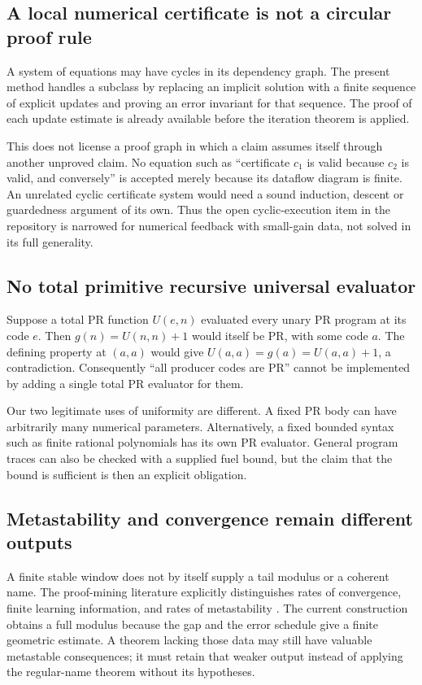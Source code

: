 \subsection{A local numerical certificate is not a circular proof rule}

A system of equations may have cycles in its dependency graph. The
present method handles a subclass by replacing an implicit solution
with a finite sequence of explicit updates and proving an error
invariant for that sequence. The proof of each update estimate is
already available before the iteration theorem is applied.

This does not license a proof graph in which a claim assumes itself
through another unproved claim. No equation such as ``certificate
\(c_1\) is valid because \(c_2\) is valid, and conversely'' is
accepted merely because its dataflow diagram is finite. An unrelated
cyclic certificate system would need a sound induction, descent or
guardedness argument of its own. Thus the open cyclic-execution item
in the repository is narrowed for numerical feedback with small-gain
data, not solved in its full generality.

\subsection{No total primitive recursive universal evaluator}

Suppose a total PR function \(U(e,n)\) evaluated every unary PR
program at its code \(e\). Then \(g(n)=U(n,n)+1\) would itself be
PR, with some code \(a\). The defining property at \((a,a)\)
would give
\(U(a,a)=g(a)=U(a,a)+1\), a contradiction. Consequently
``all producer codes are PR'' cannot be implemented by adding a
single total PR evaluator for them.

Our two legitimate uses of uniformity are different. A fixed PR
body can have arbitrarily many numerical parameters. Alternatively,
a fixed bounded syntax such as finite rational polynomials has its
own PR evaluator. General program traces can also be checked with a
supplied fuel bound, but the claim that the bound is sufficient is
then an explicit obligation.

\subsection{Metastability and convergence remain different outputs}

A finite stable window does not by itself supply a tail modulus or
a coherent name. The proof-mining literature explicitly distinguishes
rates of convergence, finite learning information, and rates of
metastability \cite{kohlenbachsafarik}. The current construction obtains
a full modulus because the gap and the error schedule give a finite
geometric estimate. A theorem lacking those data may still have
valuable metastable consequences; it must retain that weaker output
instead of applying the regular-name theorem without its hypotheses.


